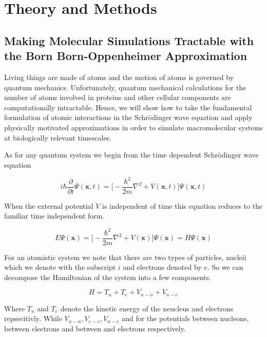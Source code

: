 \chapter{Theory and Methods}
\label{chap:methods}

\section{Making Molecular Simulations Tractable with the Born Born-Oppenheimer Approximation}
Living things are made of atoms and the motion of atoms is governed by quantum mechanics. Unfortunately, quantum mechanical calculations for the number of atoms involved in proteins and other cellular components are computationally intractable. Hence, we will show how to take the fundamental formulation of atomic interactions in the Schr\"{o}dinger wave equation and apply physically motivated approximations in order to simulate macromolecular systems at biologically relevant timescales. 

As for any quantum system we begin from the time dependent Schr\"{o}dinger wave equation 

\begin{equation}
i\hbar \frac {\partial}{\partial t} \Psi (\textbf{x},t) = \big[ -\frac{\hbar ^2}{2m}\nabla^2 + V (\textbf{x}, t) \big] \Psi (\textbf{x},t) 
\end{equation}

When the external potential $V$ is independent of time this equation reduces to the familiar time independent form. 

\begin{equation}
	E \Psi (\textbf{x}) = \big[ -\frac{\hbar ^2}{2m}\nabla^2 + V (\textbf{x}) \big] \Psi (\textbf{x}) = H \Psi(\textbf{x}) 
 \end{equation}

For an atomistic system we note that there are two types of particles, nucleii which we denote with the subscript $i$ and electrons denoted by $e$. So we can decompose the Hamiltonian of the system into a few components. 

\begin {equation}
H = T_n + T_e + V_{n-n} + V_{n-e}
\end{equation}

Where $T_n$ and $T_e$ denote the kinetic energy of the neucleus and electrons repsecitivly. While $V_{n-n}, V_{e-e}, V_{n-e}$ and for the potentials between nucleons, between  electrons and between and electrons respectively.

